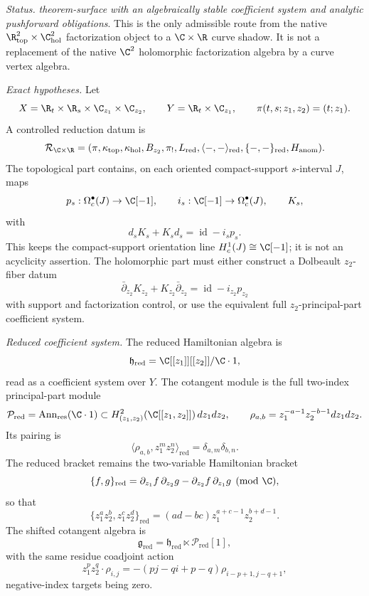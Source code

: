 \begin{stmt}\label{thm:lane-controlled-cxr-reduction}
  \emph{Status.} \emph{theorem-surface with an algebraically stable
  coefficient system and analytic pushforward obligations}.  This is the
  only admissible route from the native
  \(\R^2_{\mathrm{top}}\times\C^2_{\mathrm{hol}}\) factorization object
  to a \(\C\times\R\) curve shadow.  It is not a replacement of the
  native \(\C^2\) holomorphic factorization algebra by a curve vertex
  algebra.

  \emph{Exact hypotheses.} Let
  \[
    X=\R_t\times\R_s\times\C_{z_1}\times\C_{z_2},
    \qquad
    Y=\R_t\times\C_{z_1},
    \qquad
    \pi(t,s;z_1,z_2)=(t;z_1).
  \]
  A controlled reduction datum is
  \[
    \mathcal R_{\C\times\R}
    =
    (\pi,\kappa_{\mathrm{top}},\kappa_{\mathrm{hol}},
    B_{z_2},\pi_!,L_{\mathrm{red}},
    \langle-,-\rangle_{\mathrm{red}},
    \{-,-\}_{\mathrm{red}},H_{\mathrm{anom}}).
  \]
  The topological part contains, on each oriented compact-support
  \(s\)-interval \(J\), maps
  \[
    p_s:\Omega_c^\bullet(J)\to\C[-1],\qquad
    i_s:\C[-1]\to\Omega_c^\bullet(J),\qquad K_s,
  \]
  with
  \[
    d_sK_s+K_sd_s=\operatorname{id}-i_sp_s .
  \]
  This keeps the compact-support orientation line
  \(H_c^1(J)\cong\C[-1]\); it is not an acyclicity assertion.  The
  holomorphic part must either construct a Dolbeault
  \(z_2\)-fiber datum
  \[
    \bar\partial_{z_2}K_{z_2}+K_{z_2}\bar\partial_{z_2}
    =
    \operatorname{id}-i_{z_2}p_{z_2}
  \]
  with support and factorization control, or use the equivalent full
  \(z_2\)-principal-part coefficient system.

  \emph{Reduced coefficient system.} The reduced Hamiltonian algebra is
  \[
    \mathfrak h_{\mathrm{red}}
    =
    \C[[z_1]][[z_2]]/\C\cdot1,
  \]
  read as a coefficient system over \(Y\).  The cotangent module is the
  full two-index principal-part module
  \[
    \mathcal P_{\mathrm{red}}
    =
    \operatorname{Ann}_{\mathrm{res}}(\C\cdot1)
    \subset
    H^2_{(z_1,z_2)}(\C[[z_1,z_2]])\,dz_1dz_2,
    \qquad
    \rho_{a,b}=z_1^{-a-1}z_2^{-b-1}dz_1dz_2 .
  \]
  Its pairing is
  \[
    \langle\rho_{a,b},z_1^mz_2^n\rangle_{\mathrm{red}}
    =
    \delta_{a,m}\delta_{b,n}.
  \]
  The reduced bracket remains the two-variable Hamiltonian bracket
  \[
    \{f,g\}_{\mathrm{red}}
    =
    \partial_{z_1}f\,\partial_{z_2}g
    -
    \partial_{z_2}f\,\partial_{z_1}g
    \pmod{\C},
  \]
  so that
  \[
    \{z_1^az_2^b,z_1^cz_2^d\}_{\mathrm{red}}
    =
    (ad-bc)z_1^{a+c-1}z_2^{b+d-1}.
  \]
  The shifted cotangent algebra is
  \[
    \mathfrak g_{\mathrm{red}}
    =
    \mathfrak h_{\mathrm{red}}\ltimes
    \mathcal P_{\mathrm{red}}[1],
  \]
  with the same residue coadjoint action
  \[
    z_1^pz_2^q\cdot\rho_{i,j}
    =
    -(pj-qi+p-q)\rho_{i-p+1,j-q+1},
  \]
  negative-index targets being zero.


\end{stmt}
